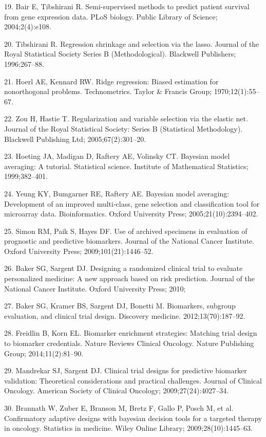\documentclass[11pt]{article}
\begin{document}
19. Bair E, Tibshirani R. Semi-supervised methods to predict patient
survival from gene expression data. PLoS biology. Public Library of
Science; 2004;2(4):e108.

20. Tibshirani R. Regression shrinkage and selection via the lasso.
Journal of the Royal Statistical Society Series B (Methodological).
Blackwell Publishers; 1996;267--88.

21. Hoerl AE, Kennard RW. Ridge regression: Biased estimation for
nonorthogonal problems. Technometrics. Taylor \& Francis Group;
1970;12(1):55--67.

22. Zou H, Hastie T. Regularization and variable selection via the
elastic net. Journal of the Royal Statistical Society: Series B
(Statistical Methodology). Blackwell Publishing Ltd; 2005;67(2):301--20.

23. Hoeting JA, Madigan D, Raftery AE, Volinsky CT. Bayesian model
averaging: A tutorial. Statistical science. Institute of Mathematical
Statistics; 1999;382--401.

24. Yeung KY, Bumgarner RE, Raftery AE. Bayesian model averaging:
Development of an improved multi-class, gene selection and
classification tool for microarray data. Bioinformatics. Oxford
University Press; 2005;21(10):2394--402.

25. Simon RM, Paik S, Hayes DF. Use of archived specimens in evaluation
of prognostic and predictive biomarkers. Journal of the National Cancer
Institute. Oxford University Press; 2009;101(21):1446--52.

26. Baker SG, Sargent DJ. Designing a randomized clinical trial to
evaluate personalized medicine: A new approach based on risk prediction.
Journal of the National Cancer Institute. Oxford University Press; 2010;

27. Baker SG, Kramer BS, Sargent DJ, Bonetti M. Biomarkers, subgroup
evaluation, and clinical trial design. Discovery medicine.
2012;13(70):187--92.

28. Freidlin B, Korn EL. Biomarker enrichment strategies: Matching trial
design to biomarker credentials. Nature Reviews Clinical Oncology.
Nature Publishing Group; 2014;11(2):81--90.

29. Mandrekar SJ, Sargent DJ. Clinical trial designs for predictive
biomarker validation: Theoretical considerations and practical
challenges. Journal of Clinical Oncology. American Society of Clinical
Oncology; 2009;27(24):4027--34.

30. Brannath W, Zuber E, Branson M, Bretz F, Gallo P, Posch M, et al.
Confirmatory adaptive designs with bayesian decision tools for a
targeted therapy in oncology. Statistics in medicine. Wiley Online
Library; 2009;28(10):1445--63.
\end{document}
